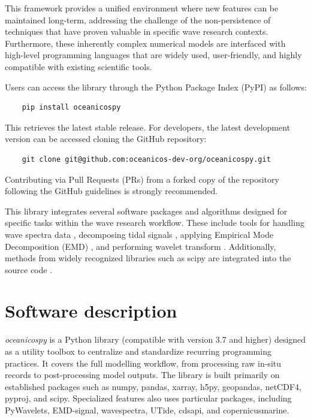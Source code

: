 \documentclass[preprint,12pt, a4paper]{elsarticle}
\begin{document}
This framework provides a unified environment where new features can be maintained long-term, addressing the challenge of the non-persistence of techniques that have proven valuable in specific wave research contexts. Furthermore, these inherently complex numerical models are interfaced with high-level programming languages that are widely used, user-friendly, and highly compatible with existing scientific tools.

Users can access the library through the Python Package Index (PyPI) as follows:

\begin{verbatim}
    pip install oceanicospy
\end{verbatim}

This retrieves the latest stable release. For developers, the latest development version can be accessed cloning the GitHub repository:

\begin{verbatim}
    git clone git@github.com:oceanicos-dev-org/oceanicospy.git
\end{verbatim}

Contributing via Pull Requests (PRs) from a forked copy of the repository following the GitHub guidelines is strongly recommended.

This library integrates several software packages and algorithms designed for specific tasks within the wave research workflow. These include tools for handling wave spectra data \cite{Guedes_etal}, decomposing tidal signals \cite{Codiga2011,Bowman_etal}, applying Empirical Mode Decomposition (EMD) \cite{laszuk_2017}, and performing wavelet transform \cite{Lee_etal_2019}. Additionally, methods from widely recognized libraries such as scipy are integrated into the source code \cite{Virtanen_etal_2020}.

\section{Software description}


\textit{oceanicospy} is a Python library (compatible with version 3.7 and higher) designed as a utility toolbox to centralize and standardize recurring programming practices. It covers the full modelling workflow, from processing raw in-situ records to post-processing model outputs. The library is built primarily on established packages such as numpy, pandas, xarray, h5py, geopandas, netCDF4, pyproj, and scipy. Specialized features also uses particular packages, including PyWavelets, EMD-signal, wavespectra, UTide, cdsapi, and copernicusmarine. 
\end{document}
